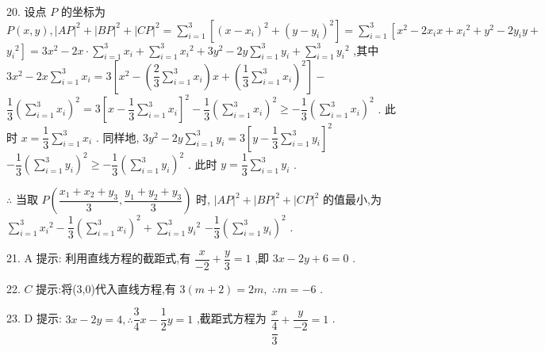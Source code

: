 20. 设点 $P$ 的坐标为 $P\left( {x,y}\right) ,{\left| AP\right| }^{2} + {\left| BP\right| }^{2} + {\left| CP\right| }^{2} = \mathop{\sum }\limits_{{i = 1}}^{3}\left\lbrack  {{\left( x - {x}_{i}\right) }^{2} + {\left( y - {y}_{i}\right) }^{2}}\right\rbrack   = \mathop{\sum }\limits_{{i = 1}}^{3}\left\lbrack  {{x}^{2} - 2{x}_{i}x + {x}_{i}{}^{2} + {y}^{2} - 2{y}_{i}y + }\right.$  $\left. {{y}_{i}{}^{2}}\right\rbrack   = 3{x}^{2} - {2x} \cdot  \mathop{\sum }\limits_{{i = 1}}^{3}{x}_{i} + \mathop{\sum }\limits_{{i = 1}}^{3}{x}_{i}{}^{2} + 3{y}^{2} - {2y}\mathop{\sum }\limits_{{i = 1}}^{3}{y}_{i} + \mathop{\sum }\limits_{{i = 1}}^{3}{y}_{i}{}^{2}$ ,其中 $3{x}^{2} - {2x}\mathop{\sum }\limits_{{i = 1}}^{3}{x}_{i} = 3\left\lbrack  {{x}^{2} - \left( {\dfrac{2}{3}\mathop{\sum }\limits_{{i = 1}}^{3}{x}_{i}}\right) x + {\left( \dfrac{1}{3}\mathop{\sum }\limits_{{i = 1}}^{3}{x}_{i}\right) }^{2}}\right\rbrack   -$  $\dfrac{1}{3}{\left( \mathop{\sum }\limits_{{i = 1}}^{3}{x}_{i}\right) }^{2} = 3{\left\lbrack  x - \dfrac{1}{3}\mathop{\sum }\limits_{{i = 1}}^{3}{x}_{i}\right\rbrack  }^{2} - \dfrac{1}{3}{\left( \mathop{\sum }\limits_{{i = 1}}^{3}{x}_{i}\right) }^{2} \geq   - \dfrac{1}{3}{\left( \mathop{\sum }\limits_{{i = 1}}^{3}{x}_{i}\right) }^{2}$ . 此时 $x = \dfrac{1}{3}\mathop{\sum }\limits_{{i = 1}}^{3}{x}_{i}$ . 同样地, $3{y}^{2} - {2y}\mathop{\sum }\limits_{{i = 1}}^{3}{y}_{i} = 3{\left\lbrack  y - \dfrac{1}{3}\mathop{\sum }\limits_{{i = 1}}^{3}{y}_{i}\right\rbrack  }^{2}$  $- \dfrac{1}{3}{\left( \mathop{\sum }\limits_{{i = 1}}^{3}{y}_{i}\right) }^{2} \geq   - \dfrac{1}{3}{\left( \mathop{\sum }\limits_{{i = 1}}^{3}{y}_{i}\right) }^{2}$ . 此时 $y = \dfrac{1}{3}\mathop{\sum }\limits_{{i = 1}}^{3}{y}_{i}$ .

$\therefore$ 当取 $P\left( {\dfrac{{x}_{1} + {x}_{2} + {y}_{3}}{3},\dfrac{{y}_{1} + {y}_{2} + {y}_{3}}{3}}\right)$ 时, ${\left| AP\right| }^{2} + {\left| BP\right| }^{2} + {\left| CP\right| }^{2}$ 的值最小,为 $\mathop{\sum }\limits_{{i = 1}}^{3}{x}_{i}{}^{2} - \dfrac{1}{3}{\left( \mathop{\sum }\limits_{{i = 1}}^{3}{x}_{i}\right) }^{2} + \mathop{\sum }\limits_{{i = 1}}^{3}{y}_{i}{}^{2}$  $- \dfrac{1}{3}{\left( \mathop{\sum }\limits_{{i = 1}}^{3}{y}_{i}\right) }^{2}$ .

21. A 提示: 利用直线方程的截距式,有 $\dfrac{x}{-2} + \dfrac{y}{3} = 1$ ,即 ${3x} - {2y} + 6 = 0$ .

22. $C$ 提示:将(3,0)代入直线方程,有 $3\left( {m + 2}\right)  = {2m},\;\therefore m =  - 6$ .

23. D 提示: ${3x} - {2y} = 4,\therefore \dfrac{3}{4}x - \dfrac{1}{2}y = 1$ ,截距式方程为 $\dfrac{x}{\dfrac{4}{3}} + \dfrac{y}{-2} = 1$ .

